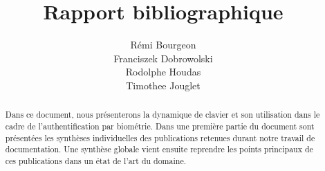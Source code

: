 








\title{Rapport bibliographique}
\author{Rémi Bourgeon\\
Franciszek Dobrowolski\\
Rodolphe Houdas\\
Timothee Jouglet}





\maketitle
\newpage
\tableofcontents
\newpage


\begin{abstract}
Dans ce document, nous présenterons la dynamique de clavier et son utilisation dans le cadre de l'authentification par biométrie. Dans une première partie du document sont présentées les synthèses individuelles des publications retenues durant notre travail de documentation. Une synthèse globale vient ensuite reprendre les points principaux de ces publications dans un état de l'art du domaine.
\end{abstract}

\newpage





